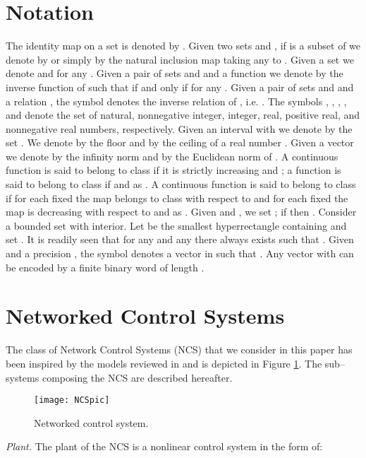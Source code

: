 \documentclass{amsart}
\begin{document}
\section{Notation}\label{sec:Notation}
The identity map on a set  is denoted by . Given two sets  and , if  is a subset of  we denote by  or simply by  the natural inclusion map taking any  to . 
Given a set  we denote  and  for any . 
Given a pair of sets  and  and a function  we denote by  the inverse function of  such that  if and only if  for any . 
Given a pair of sets  and  and a relation , the symbol  denotes the inverse relation of , i.e. . The symbols , , , ,  and  denote the set of natural, nonnegative integer, integer, real, positive real, and nonnegative real numbers, respectively. Given an interval  with  we denote by  the set . We denote by  the floor and by  the ceiling of a real number . Given a vector  we denote by  the infinity norm and by  the Euclidean norm of . A continuous function \mbox{} is said to belong to class  if it is strictly increasing and
\mbox{}; a function  is said to belong to class  if \mbox{} and 
as . A continuous function \mbox{} is said to belong to class  if for each fixed  the map  belongs to class  with respect to  and for each fixed  the map  is decreasing with respect to  and  as \mbox{}. 
Given  and , we set ; if  then . Consider a bounded set  with interior. Let  be the smallest hyperrectangle containing  and set . It is readily seen that for any  and any  there always exists  such that . 
Given  and a precision , the symbol  denotes a vector in  such that . Any vector  with  can be encoded by a finite binary word of length .  

\section{Networked Control Systems}\label{sec:modelingNCS}
The class of Network Control Systems (NCS) that we consider in this paper has been inspired by the models reviewed in \cite{HeemelsSurvey} and is depicted in Figure \ref{NCSpic}. The sub--systems composing the NCS are described hereafter.\\

\begin{figure}
\begin{center}
\texttt{[image: NCSpic]}
\caption{Networked control system.}
\label{NCSpic}
\end{center}
\end{figure}

\textit{Plant.} The plant  of the NCS is a nonlinear control system in the form of: 
\end{document}
